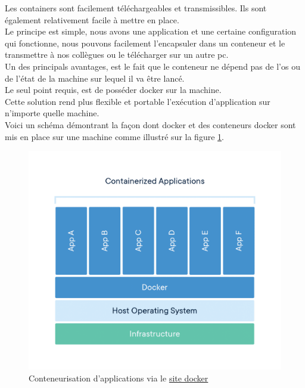 \documentclass[
    iai, %
    il, %
]{heig-tb}
\begin{document}
Les containers sont facilement téléchargeables et transmissibles. Ils sont également relativement facile à mettre en place.\\
Le principe est simple, nous avons une application et une certaine configuration qui fonctionne, nous pouvons facilement l'encapsuler dans un \Gls{conteneur} et le transmettre à nos collègues ou le télécharger sur un autre pc.\\
Un des principals avantages, est le fait que le \Gls{conteneur} ne dépend pas de l'\Gls{os} ou de l'état de la machine sur lequel il va être lancé.\\
Le seul point requis, est de posséder \Gls{docker} sur la machine.\\
Cette solution rend plus flexible et portable l'exécution d'application sur n'importe quelle machine.\\
Voici un schéma démontrant la façon dont \Gls{docker} et des \Gls{conteneur}s \Gls{docker} sont mis en place sur une
machine comme illustré sur la figure \ref{docker-container-app}.

\begin{center}
    \begin{figure}[H]
        \includegraphics[width=\textwidth]{./assets/figures/container-what-is-container.png}
        \caption[Conteneurisation d'applications]{Conteneurisation d'applications via
            le \href{https://www.docker.com/wp-content/uploads/2021/11/container-what-is-container.png}{site docker}
            \label{docker-container-app}}
    \end{figure}
\end{center}
\end{document}
